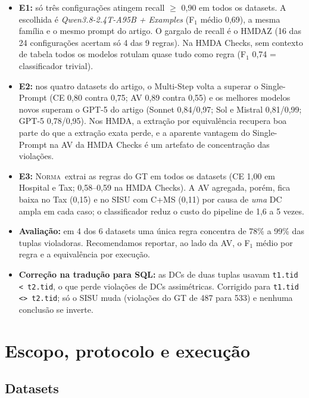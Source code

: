 \documentclass[11pt,a4paper]{article}
\newcommand{\system}{\textsc{Norma}}
\begin{document}
\begin{itemize}
  \item \textbf{E1:} só três configurações atingem recall $\geq$ 0,90 em todos os datasets. A escolhida é
        \emph{Qwen3.8-2.4T-A95B + Examples} (F$_1$ médio 0,69), a mesma família e o mesmo prompt do artigo. O gargalo
        de recall é o HMDAZ (16 das 24 configurações acertam só 4 das 9 regras). Na HMDA Checks, sem contexto de
        tabela todos os modelos rotulam quase tudo como regra (F$_1$ 0,74 = classificador trivial).
  \item \textbf{E2:} nos quatro datasets do artigo, o Multi-Step volta a superar o Single-Prompt (CE 0,80 contra
        0,75; AV 0,89 contra 0,55) e os melhores modelos novos superam o GPT-5 do artigo (Sonnet 0,84/0,97; Sol e
        Mistral 0,81/0,99; GPT-5 0,78/0,95). Nos HMDA, a extração por equivalência recupera boa parte do que a
        extração exata perde, e a aparente vantagem do Single-Prompt na AV da HMDA Checks é um artefato de
        concentração das violações.
  \item \textbf{E3:} \system\ extrai as regras do GT em todos os datasets (CE 1,00 em Hospital e Tax; 0,58--0,59
        na HMDA Checks). A AV agregada, porém, fica baixa no Tax (0,15) e no SISU com C+MS (0,11) por causa de
        \emph{uma} DC ampla em cada caso; o classificador reduz o custo do pipeline de 1,6 a 5 vezes.
  \item \textbf{Avaliação:} em 4 dos 6 datasets uma única regra concentra de 78\% a 99\% das tuplas violadoras.
        Recomendamos reportar, ao lado da AV, o F$_1$ médio por regra e a equivalência por execução.
  \item \textbf{Correção na tradução para SQL:} as DCs de duas tuplas usavam \texttt{t1.tid < t2.tid}, o que perde
        violações de DCs assimétricas. Corrigido para \texttt{t1.tid <> t2.tid}; só o SISU muda (violações do GT de
        487 para 533) e nenhuma conclusão se inverte.
\end{itemize}

\section{Escopo, protocolo e execução}

\subsection{Datasets}
\end{document}
